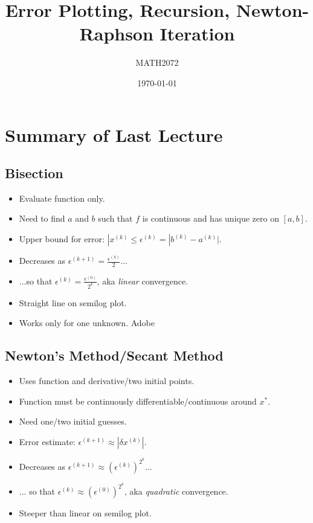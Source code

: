 \documentclass{article}
\title{Error Plotting, Recursion, Newton-Raphson Iteration}
\author{MATH2072}
\date{\today}
\begin{document}
\maketitle

\section*{Summary of Last Lecture}

\subsection*{Bisection}
\begin{itemize}
	\item Evaluate function only.
	\item Need to find $a$ and $b$ such that $f$ is continuous and has unique zero on $[a,b]$. 
	\item Upper bound for error: $|x^{(k)} \leq \epsilon^{(k)} = |b^{(k)}-a^{(k)}|$.
	\item Decreases as $\epsilon^{(k+1)}=\frac{\epsilon^{(k)}}{2}$...
	\item ...so that $\epsilon^{(k)}=\frac{\epsilon^{(0)}}{2^k}$, aka \textit{linear} convergence. 
	\item Straight line on semilog plot.
	\item Works only for one unknown. Adobe
\end{itemize}

\subsection*{Newton's Method/Secant Method}
\begin{itemize}
	\item Uses function and derivative/two initial points.
	\item Function must be continuously differentiable/continuous around $x^*$.
	\item Need one/two initial guesses.
	\item Error estimate: $\epsilon^{(k+1)} \approx |\delta x^{(k)}|$.
	\item Decreases as $\epsilon^{(k+1)} \approx (\epsilon^{(k)})^{2^k}$...
	\item ... so that $\epsilon^{(k)} \approx (\epsilon^{(0)})^{2^k}$, aka \textit{quadratic} convergence.
	\item Steeper than linear on semilog plot.  
\end{itemize}
\end{document}
